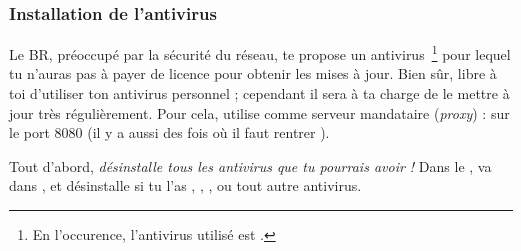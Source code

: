 



\subsubsection{Installation de l'antivirus}
\label{antivirus} Le BR, préoccupé par la sécurité du réseau, te propose un antivirus~\footnote{En
l'occurence, l'antivirus utilisé est .} pour lequel tu n'auras pas à
payer de licence pour obtenir les mises à jour. Bien s\^{u}r, libre à toi d'utiliser ton antivirus
personnel ; cependant il sera à ta charge de le mettre à jour très régulièrement. Pour cela,
utilise comme serveur mandataire (\emph{proxy}) :  sur le port 8080 (il y a aussi des fois o\`u il 
faut rentrer ).

Tout d'abord, \emph{désinstalle tous les antivirus que tu pourrais
avoir !} Dans le , va dans ,  et
désinstalle si tu l'as , , , ou tout autre antivirus.

